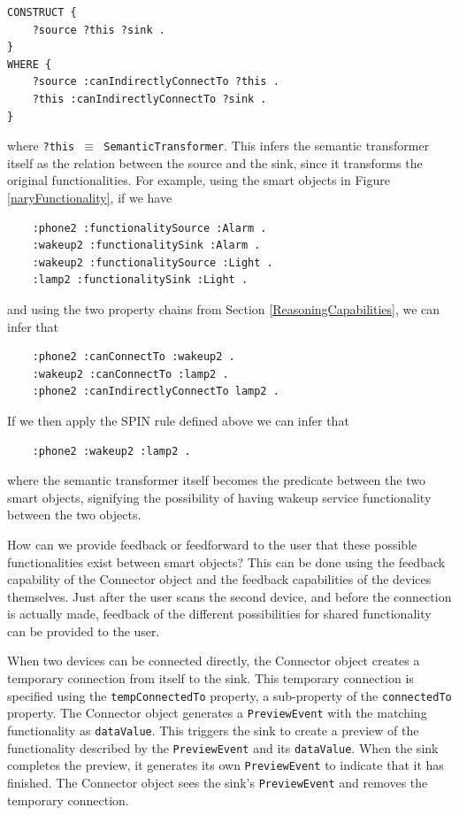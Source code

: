 \begin{verbatim}
CONSTRUCT {
    ?source ?this ?sink .
}
WHERE {
    ?source :canIndirectlyConnectTo ?this .
    ?this :canIndirectlyConnectTo ?sink .
}
\end{verbatim}

where \texttt{?this \ensuremath{\equiv} SemanticTransformer}. This infers the semantic transformer itself as the relation between the source and the sink, since it transforms the original functionalities. For example, using the smart objects in Figure \ref{naryFunctionality}, if we have 

\begin{verbatim}
	:phone2 :functionalitySource :Alarm .
	:wakeup2 :functionalitySink :Alarm .
	:wakeup2 :functionalitySource :Light .
	:lamp2 :functionalitySink :Light .
\end{verbatim}

and using the two property chains from Section \ref{ReasoningCapabilities}, we can infer that

\begin{verbatim}
	:phone2 :canConnectTo :wakeup2 .
	:wakeup2 :canConnectTo :lamp2 .
	:phone2 :canIndirectlyConnectTo lamp2 .
\end{verbatim}

If we then apply the \ac{SPIN} rule defined above we can infer that 

\begin{verbatim}
	:phone2 :wakeup2 :lamp2 .
\end{verbatim}

where the semantic transformer itself becomes the predicate between the two smart objects, signifying the possibility of having wakeup service functionality between the two objects.


How can we provide feedback or feedforward to the user that these possible functionalities exist between smart objects? This can be done using the feedback capability of the Connector object and the feedback capabilities of the devices themselves. Just after the user scans the second device, and before the connection is actually made, feedback of the different possibilities for shared functionality can be provided to the user. 

When two devices can be connected directly, the Connector object creates a temporary connection from itself to the sink. This temporary connection is specified using the \texttt{tempConnectedTo} property, a sub-property of the \texttt{connectedTo} property. The Connector object generates a \texttt{PreviewEvent} with the matching functionality as \texttt{dataValue}. This triggers the sink to create a preview of the functionality described by the \texttt{PreviewEvent} and its \texttt{dataValue}.  When the sink completes the preview, it generates its own \texttt{PreviewEvent} to indicate that it has finished. The Connector object sees the sink's \texttt{PreviewEvent} and removes the temporary connection. 

